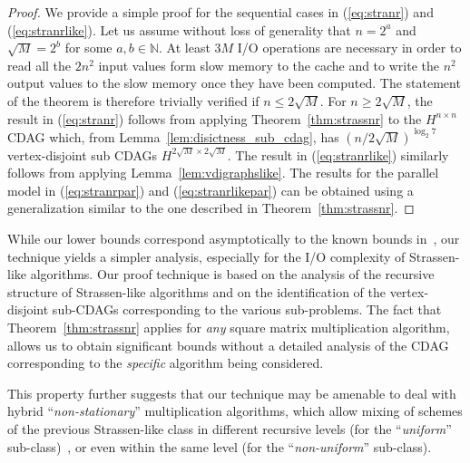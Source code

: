 \documentclass[a4paper,UKenglish]{lipics-v2016}
\newcommand{\io }{I/O }
\begin{document}
\begin{proof}
	We provide a simple proof for the sequential cases in (\ref{eq:stranr}) and (\ref{eq:stranrlike}). Let us assume without loss of generality that $n = 2^a$ and $\sqrt{M}=2^b$  for some $a,b\in \mathbb{N}$. At least $3M$ \io operations are necessary in order to read all the $2n^2$ input values form slow memory to the cache and to write the $n^2$ output values to the slow memory once they have been computed. The statement of the theorem is therefore trivially verified if $n\leq 2\sqrt{M}$. 
For $n\geq 2\sqrt{M}$, the result in (\ref{eq:stranr}) follows from applying Theorem~\ref{thm:strassnr} to the $H^{n\times n}$ CDAG which, from Lemma~\ref{lem:disictness_sub_cdag}, has $\left(n/2\sqrt{M}\right)^{\log_2 7}$ vertex-disjoint sub CDAGs $H^{2\sqrt{M} \times 2\sqrt{M}}$. 
The result in (\ref{eq:stranrlike}) similarly follows from applying Lemma~\ref{lem:vdigraphslike}. The results for the parallel model in (\ref{eq:stranrpar}) and (\ref{eq:stranrlikepar}) can be obtained using a generalization similar to the one described in Theorem~\ref{thm:strassnr}.
\end{proof}
While our lower bounds correspond asymptotically to the known bounds
in~\cite{scott2015matrix}, our technique yields a simpler analysis,
especially for the \io complexity of Strassen-like algorithms. Our
proof technique is based on the analysis of the recursive structure of
Strassen-like algorithms and on the identification of the
vertex-disjoint sub-CDAGs corresponding to the various
sub-problems. The fact that Theorem~\ref{thm:strassnr} applies for
\emph{any} square matrix multiplication algorithm, allows us to obtain
significant bounds without a detailed analysis of the CDAG
corresponding to the \emph{specific} algorithm being considered.

This property further suggests that our technique may be amenable to
deal with hybrid ``\emph{non-stationary}'' multiplication algorithms, which allow mixing of schemes of the previous Strassen-like class in different recursive levels (for the ``\emph{uniform}'' sub-class)~\cite{douglas1994gemmw}, or even within the same level (for the ``\emph{non-uniform}'' sub-class).
\end{document}
